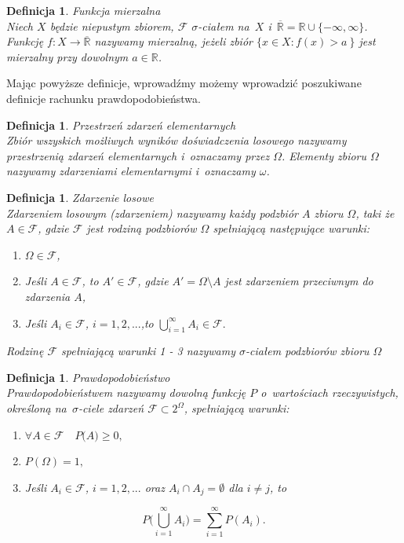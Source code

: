 \documentclass[12pt,a4paper]{report}
\newtheorem{definition}[theorem]{Definicja}
\begin{document}
\begin{definition}{Funkcja mierzalna \cite[w oparciu o~rozdział 8.2]{rudnicki2006}}\\
Niech $X$ będzie niepustym zbiorem, $\mathcal{F}$  $\sigma$-ciałem na~$X$ i~$\overline{\mathbb{R}} = \mathbb{R} \cup \{-\infty, \infty \}$. Funkcję $f: X \rightarrow \overline{\mathbb{R}}$ nazywamy mierzalną, jeżeli zbiór $\{ x \in X: f(x) > a~\}$ jest mierzalny przy dowolnym $a \in \mathbb{R}$.
\end{definition}

Mając powyższe definicje, wprowadźmy możemy wprowadzić poszukiwane definicje rachunku prawdopodobieństwa. 

\begin{definition}{Przestrzeń zdarzeń elementarnych \cite[w oparciu o~rozdział 1.1]{krysicki1999}}\\
Zbiór wszyskich możliwych wyników doświadczenia losowego nazywamy przestrzenią zdarzeń elementarnych i~oznaczamy przez $\Omega$. Elementy zbioru $\Omega$ nazywamy zdarzeniami elementarnymi i~oznaczamy $\omega$.
\end{definition}

\begin{definition}{Zdarzenie losowe \cite[w oparciu o~rozdział 1.1]{krysicki1999}}\\
Zdarzeniem losowym (zdarzeniem) nazywamy każdy podzbiór $\textit{A}$ zbioru $\Omega$, taki że  $A \in \mathcal{F}$, gdzie $\mathcal{F}$ jest rodziną podzbiorów $\Omega$ spełniającą następujące warunki:
\begin{enumerate}
\item $\Omega \in \mathcal{F}$,
\item Jeśli $A \in \mathcal{F}$, to $\textit{A$'$} \in \mathcal{F}$, gdzie $\textit{A$'$} = \Omega \setminus A $ jest zdarzeniem przeciwnym do zdarzenia $\textit{A}$,
\item Jeśli $\textit{A}_{i} \in \mathcal{F}$, $i= 1, 2, ...$,to $\bigcup\limits_{i=1}^{\infty} A_{i} \in \mathcal{F}. $
\end{enumerate}
Rodzinę $\mathcal{F}$ spełniającą warunki 1 - 3 nazywamy $\sigma$-ciałem podzbiorów zbioru $\Omega$
\end{definition}


\begin{definition}{Prawdopodobieństwo \cite[w oparciu o~rozdział 1.1]{krysicki1999}}\\
Prawdopodobieństwem nazywamy dowolną funkcję $P$ o~wartościach rzeczywistych, określoną na~$\sigma$-ciele zdarzeń $\mathcal{F} \subset 2^\Omega$, spełniającą warunki: 
\begin{enumerate}
\item $\forall{\textit{A} \in \mathcal{F}} \quad \textit{P(A)} \geq 0,$
\item $\textit{P}(\Omega) = 1,$
\item Jeśli $\textit{A}_{i} \in \mathcal{F}$, $i= 1, 2, ...$ oraz $A_{i} \cap A_{j} = \emptyset $ dla $i \neq j$, to 
\end{enumerate}

$$P \Big(\bigcup\limits_{i=1}^{\infty} A_{i} \Big)=\sum_{i=1}^{\infty} P(A_{i}). $$

\end{definition}
\end{document}
